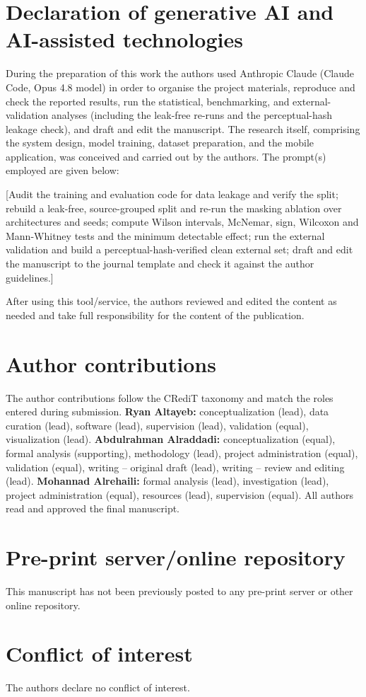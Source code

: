 \documentclass{elektr}
\begin{document}
\section*{Declaration of generative AI and AI-assisted technologies}
During the preparation of this work the authors used Anthropic Claude (Claude Code, Opus 4.8 model) in order to organise the project materials, reproduce and check the reported results, run the statistical, benchmarking, and external-validation analyses (including the leak-free re-runs and the perceptual-hash leakage check), and draft and edit the manuscript. The research itself, comprising the system design, model training, dataset preparation, and the mobile application, was conceived and carried out by the authors. The prompt(s) employed are given below:

[Audit the training and evaluation code for data leakage and verify the split; rebuild a leak-free, source-grouped split and re-run the masking ablation over architectures and seeds; compute Wilson intervals, McNemar, sign, Wilcoxon and Mann-Whitney tests and the minimum detectable effect; run the external validation and build a perceptual-hash-verified clean external set; draft and edit the manuscript to the journal template and check it against the author guidelines.]

After using this tool/service, the authors reviewed and edited the content as needed and take full responsibility for the content of the publication.

\section*{Author contributions}
The author contributions follow the CRediT taxonomy and match the roles entered during submission. \textbf{Ryan Altayeb:} conceptualization (lead), data curation (lead), software (lead), supervision (lead), validation (equal), visualization (lead). \textbf{Abdulrahman Alraddadi:} conceptualization (equal), formal analysis (supporting), methodology (lead), project administration (equal), validation (equal), writing -- original draft (lead), writing -- review and editing (lead). \textbf{Mohannad Alrehaili:} formal analysis (lead), investigation (lead), project administration (equal), resources (lead), supervision (equal). All authors read and approved the final manuscript.

\section*{Pre-print server/online repository}
This manuscript has not been previously posted to any pre-print server or other online repository.

\section*{Conflict of interest}
The authors declare no conflict of interest.
\end{document}

